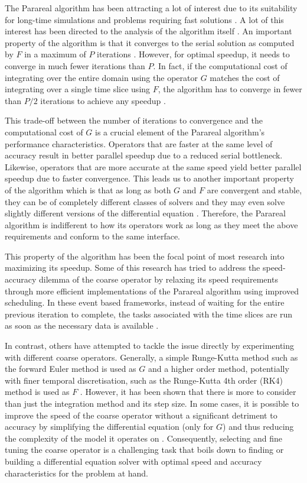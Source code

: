 \documentclass{article}
\begin{document}
The Parareal algorithm has been attracting a lot of interest due to its suitability for long-time simulations and problems requiring fast solutions \cite{gurrala2015}. A lot of this interest has been directed to the analysis of the algorithm itself \cite{staff2003} \cite{gander2007}. An important property of the algorithm is that it converges to the serial solution as computed by $F$ in a maximum of $P$ iterations \cite[p.~6-7]{staff2003}. However, for optimal speedup, it needs to converge in much fewer iterations than $P$. In fact, if the computational cost of integrating over the entire domain using the operator $G$ matches the cost of integrating over a single time slice using $F$, the algorithm has to converge in fewer than $P / 2$ iterations to achieve any speedup \cite[p.~7]{staff2003}.

This trade-off between the number of iterations to convergence and the computational cost of $G$ is a crucial element of the Parareal algorithm's performance characteristics. Operators that are faster at the same level of accuracy result in better parallel speedup due to a reduced serial bottleneck. Likewise, operators that are more accurate at the same speed yield better parallel speedup due to faster convergence. This leads us to another important property of the algorithm which is that as long as both $G$ and $F$ are convergent and stable, they can be of completely different classes of solvers and they may even solve slightly different versions of the differential equation \cite[p.~8]{staff2003}. Therefore, the Parareal algorithm is indifferent to how its operators work as long as they meet the above requirements and conform to the same interface.

This property of the algorithm has been the focal point of most research into maximizing its speedup. Some of this research has tried to address the speed-accuracy dilemma of the coarse operator by relaxing its speed requirements through more efficient implementations of the Parareal algorithm using improved scheduling. In these event based frameworks, instead of waiting for the entire previous iteration to complete, the tasks associated with the time slices are run as soon as the necessary data is available \cite{aubanel2011} \cite{berry2012}.

In contrast, others have attempted to tackle the issue directly by experimenting with different coarse operators. Generally, a simple Runge-Kutta method such as the forward Euler method is used as $G$ and a higher order method, potentially with finer temporal discretisation, such as the Runge-Kutta 4th order (RK4) method is used as $F$ \cite[p.~1822]{gurrala2015} \cite[p.~2]{duan2016}. However, it has been shown that there is more to consider than just the integration method and its step size. In some cases, it is possible to improve the speed of the coarse operator without a significant detriment to accuracy by simplifying the differential equation (only for $G$) and thus reducing the complexity of the model it operates on \cite{duan2016}. Consequently, selecting and fine tuning the coarse operator is a challenging task that boils down to finding or building a differential equation solver with optimal speed and accuracy characteristics for the problem at hand.
\end{document}
